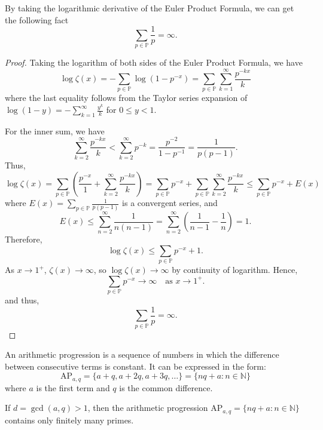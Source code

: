 \documentclass{elegantbook}
\begin{document}
\begin{corollary} \label{cor:divergence_sum_reciprocal_primes}
  By taking the logarithmic derivative of the Euler Product Formula, we can get the following fact
  \[
    \sum_{p \in \mathbb{P}} \frac{1}{p}=\infty.
  \]
\end{corollary}

\begin{proof}
  Taking the logarithm of both sides of the Euler Product Formula, we have
  \[
    \log \zeta(x) = -\sum_{p \in \mathbb{P}} \log(1 - p^{-x}) = \sum_{p \in \mathbb{P}} \sum_{k=1}^{\infty} \frac{p^{-kx}}{k} 
  \]
  where the last equality follows from the Taylor series expansion of $\log(1 - y) = -\sum_{k=1}^{\infty} \frac{y^k}{k}$ for $0 \leq y < 1$.
  
  For the inner sum, we have
  \[
    \sum_{k=2}^{\infty} \frac{p^{-kx}}{k} < \sum_{k=2}^{\infty} p^{-k}= \frac{p^{-2}}{1 - p^{-1}} = \frac{1}{p(p-1)}.
  \]
  Thus,
  \[
    \log \zeta(x) = \sum_{p \in \mathbb{P}} \left( \frac{p^{-x}}{1} + \sum_{k=2}^{\infty} \frac{p^{-kx}}{k} \right) = \sum_{p \in \mathbb{P}} p^{-x} + \sum_{p \in \mathbb{P}} \sum_{k=2}^{\infty} \frac{p^{-kx}}{k} \leq \sum_{p \in \mathbb{P}} p^{-x} + E(x)
  \]
  where $E(x) = \sum_{p \in \mathbb{P}} \frac{1}{p(p-1)}$ is a convergent series, and
  \[
    E(x) \leq \sum_{n=2}^{\infty} \frac{1}{n(n-1)} = \sum_{n=2}^{\infty} \left( \frac{1}{n-1} - \frac{1}{n} \right) = 1.
  \]
  Therefore,
  \[
    \log \zeta(x) \leq \sum_{p \in \mathbb{P}} p^{-x} + 1.
  \]
  As $x \to 1^+$, $\zeta(x) \to \infty$, so $\log \zeta(x) \to \infty$ by continuity of logarithm. Hence,
  \[
    \sum_{p \in \mathbb{P}} p^{-x} \to \infty \quad \text{as } x \to 1^+.
  \]
  and thus,
  \[
    \sum_{p \in \mathbb{P}} \frac{1}{p} = \infty.
  \]
\end{proof}

\begin{definition}
  An arithmetic progression is a sequence of numbers in which the difference between consecutive terms is constant. It can be expressed in the form:
  \[
    \mathrm{AP}_{a,q}=\{a + q, a + 2q, a + 3q, \ldots\} = \{nq + a : n \in \mathbb{N}\}
  \]
  where $a$ is the first term and $q$ is the common difference.
\end{definition}

\begin{proposition}
  If $d=\gcd(a, q) > 1$, then the arithmetic progression $\mathrm{AP}_{a,q}=\{nq + a : n \in \mathbb{N}\}$ contains only finitely many primes.
\end{proposition}
\end{document}
